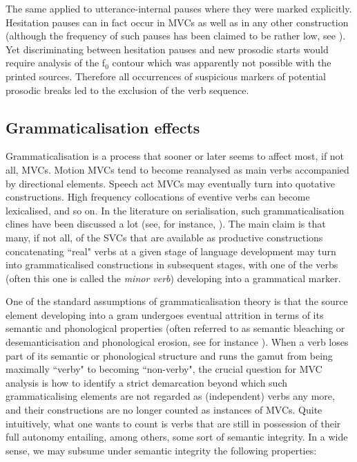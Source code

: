 The same applied to utterance-internal pauses where they were marked explicitly. Hesitation pauses can in fact occur in MVCs as well as in any other construction (although the frequency of such pauses has been claimed to be rather low, see \citealt{givon1991serial}). Yet discriminating between hesitation pauses and new prosodic starts would require analysis of the f$_0$ contour which was apparently not possible with the printed sources. Therefore all occurrences of suspicious markers of potential prosodic breaks led to the exclusion of the verb sequence.

\subsection{Grammaticalisation effects} \label{sec:grammaticalisation}

Grammaticalisation is a process that sooner or later seems to affect most, if not all, MVCs. Motion MVCs tend to become reanalysed as main verbs accompanied by directional elements. Speech act MVCs may eventually turn into quotative constructions. High frequency collocations of eventive verbs can become lexicalised, and so on. In the literature on serialisation, such grammaticalisation clines have been discussed a lot (see, for instance, \citealt{lord1993historical, crowley2002serial, bowern2008diachrony}). The main claim is that many, if not all, of the SVCs that are available as productive constructions concatenating ``real" verbs at a given stage of language development may turn into grammaticalised constructions in subsequent stages, with one of the verbs (often this one is called the \textit{minor verb}) developing into a grammatical marker. 

One of the standard assumptions of grammaticalisation theory is that the source element developing into a gram undergoes eventual attrition in terms of its semantic and phonological properties (often referred to as semantic bleaching or desemanticisation and phonological erosion, see for instance \citealt{lehmann2002thoughts}). When a verb loses part of its semantic or phonological structure and runs the gamut from being maximally ``verby" to becoming ``non-verby", the crucial question for MVC analysis is how to identify a strict demarcation beyond which such grammaticalising elements are not regarded as (independent) verbs any more, and their constructions are no longer counted as instances of MVCs. Quite intuitively, what one wants to count is verbs that are still in possession of their full autonomy entailing, among others, some sort of semantic integrity. In a wide sense, we may subsume under semantic integrity the following properties:

